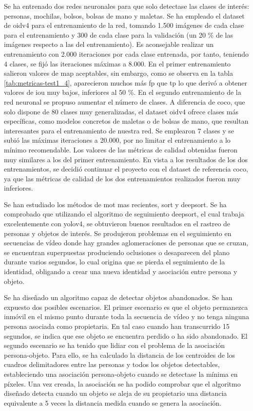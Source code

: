 Se ha entrenado dos redes neuronales para que solo detectase las clases de interés: personas, mochilas, bolsos, bolsas de mano y maletas. Se ha empleado el dataset de \gls{oidv4} para el entrenamiento de la red, tomando 1.500 imágenes de cada clase para el entrenamiento y 300 de cada clase para la validación (un 20 \% de las imágenes respecto a las del entrenamiento). Es aconsejable realizar un entrenamiento con 2.000 iteraciones por cada clase entrenada, por tanto, teniendo 4 clases, se fijó las iteraciones máximas a 8.000. En el primer entrenamiento salieron valores de \gls{map} aceptables, sin embargo, como se observa en la tabla \ref{tab:metricas-test1_4}, aparecieron muchos más \gls{fp} que \gls{tp} lo que derivó a obtener valores de \gls{iou} muy bajos, inferiores al 50 \%. En el segundo entrenamiento de la red neuronal se propuso aumentar el número de clases. A diferencia de \gls{coco}, que solo dispone de 80 clases muy generalizadas, el dataset \gls{oidv4} ofrece clases más específicas, como modelos concretos de maletas o de bolsas de mano, que resultan interesantes para el entrenamiento de nuestra red. Se emplearon 7 clases y se subió las máximas iteraciones a 20.000, por no limitar el entrenamiento a lo mínimo recomendable. Los valores de las métricas de calidad obtenidas fueron muy similares a los del primer entrenamiento. En vista a los resultados de los dos entrenamientos, se decidió continuar el proyecto con el dataset de referencia \gls{coco}, ya que las métricas de calidad de los dos entrenamientos realizados fueron muy inferiores.

Se han estudiado los métodos de \gls{mot} mas recientes, \gls{sort} y \gls{deepsort}. Se ha comprobado que utilizando el algoritmo de seguimiento \gls{deepsort}, el cual trabaja excelentemente con \gls{yolov4}, se obtuvieron buenos resultados en el rastreo de personas y objetos de interés. Se produjeron problemas en el seguimiento en secuencias de vídeo donde hay grandes aglomeraciones de personas que se cruzan, se encuentran superpuestas produciendo oclusiones o desaparecen del plano durante varios segundos, lo cual origina que se pierda el seguimiento de la identidad, obligando a crear una nueva identidad y asociación entre persona y objeto.

Se ha diseñado un algoritmo capaz de detectar objetos abandonados. Se han expuesto dos posibles escenarios. El primer escenario es que el objeto permanezca inmóvil en el mismo punto durante toda la secuencia de vídeo y no tenga ninguna persona asociada como propietaria. En tal caso cuando han transcurrido 15 segundos, se indica que ese objeto se encuentra perdido o ha sido abandonado. El segundo escenario se ha tenido que lidiar con el problema de la asociación persona-objeto. Para ello, se ha calculado la distancia de los centroides de los cuadros delimitadores entre las personas y todos los objetos detectables, estableciendo una asociación persona-objeto cuando se detectase la mínima en píxeles. Una vez creada, la asociación se ha podido comprobar que el algoritmo diseñado detecta cuando un objeto se aleja de su propietario una distancia equivalente a 5 veces la distancia medida cuando se genera la asociación.

